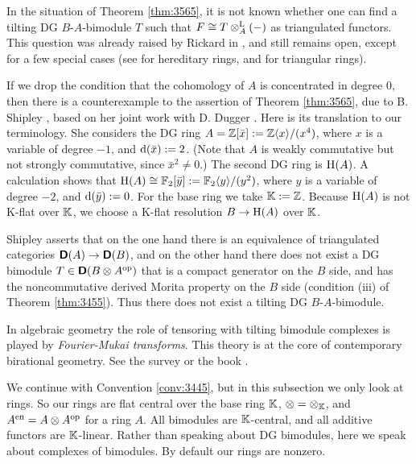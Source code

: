 \begin{rem} \label{rem:3565}
In the situation of Theorem \ref{thm:3565}, it is not known whether one can 
find a tilting DG $B$-$A$-bimodule $T$ such that 
$F \cong T \otimes^{\mathrm{L}}_{A} (-)$ as triangulated functors. 
This question was already raised by Rickard in \cite{Ric1}, and still remains 
open, except for a few special cases (see \cite{MiYe} for hereditary rings, and 
\cite{Ch} for triangular rings). 

If we drop the condition that the cohomology of $A$ is concentrated in  
degree $0$, then there is a counterexample to the assertion of Theorem 
\ref{thm:3565}, due to B. Shipley \cite[Section 5]{Shi}, based on her joint 
work with D. Dugger \cite{DuSh}. Here is its translation to our 
terminology. She considers the DG ring  
$A = \mathbb{Z}[\bar{x}] := \mathbb{Z} \langle x \rangle / (x^4)$,
where $x$ is a variable of degree $-1$, and $\mathrm{d}(\bar{x}) := 2$. 
(Note that $A$ is weakly commutative but not strongly commutative, since 
$\bar{x}^2 \neq 0$.) 
The second DG ring is $\operatorname{H}(A)$. A calculation shows that 
$\operatorname{H}(A) \cong  \mathbb{F}_2[\bar{y}] := \mathbb{F}_2 \langle y \rangle / (y^2)$,
where $y$ is a variable of degree $-2$, and $\mathrm{d}(\bar{y}) := 0$.
For the base ring we take $\mathbb{K} := \mathbb{Z}$. Because $\operatorname{H}(A)$ is not K-flat over 
$\mathbb{K}$, we choose a K-flat resolution $B \to \operatorname{H}(A)$ over $\mathbb{K}$. 

Shipley asserts that on the one hand there is an equivalence of triangulated 
categories $\boldsymbol{\mathsf{D}}(A) \to \boldsymbol{\mathsf{D}}(B)$, and on the other hand there does not 
exist a DG bimodule $T \in \boldsymbol{\mathsf{D}}(B \otimes A^{\mathrm{op}})$ 
that is a compact generator on the $B$ side, 
and has the noncommutative derived Morita property on the $B$ side
(condition (iii) of Theorem \ref{thm:3455}). Thus there does not exist a 
tilting DG $B$-$A$-bimodule. 
\end{rem}

\begin{rem} \label{rem:3596}
In algebraic geometry the role of tensoring with tilting bimodule complexes is 
played by {\em Fourier-Mukai transforms}. This theory is at the core of 
contemporary birational geometry. See the survey \cite{HiVdB} or the book 
\cite{Huy}. 
\end{rem}





\label{subsec:tilting-rings}

We continue with Convention \ref{conv:3445}, but in this subsection 
we only look at rings. So our rings are flat central over the base ring $\mathbb{K}$, 
$\otimes = \otimes_{\mathbb{K}}$, and $A^{\mathrm{en}} = A \otimes A^{\mathrm{op}}$ for a ring $A$. 
All bimodules are $\mathbb{K}$-central, and all additive functors are $\mathbb{K}$-linear.  
Rather than speaking about DG bimodules, here we speak about complexes of 
bimodules. By default our rings are nonzero. 


